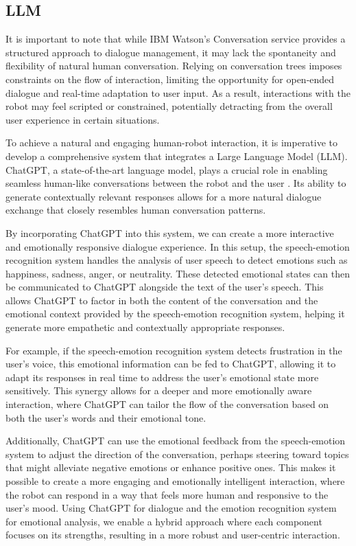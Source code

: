 \subsection{LLM}

It is important to note that while IBM Watson's Conversation service provides a structured approach to dialogue management, it may lack the spontaneity and flexibility of natural human conversation. Relying on conversation trees imposes constraints on the flow of interaction, limiting the opportunity for open-ended dialogue and real-time adaptation to user input. As a result, interactions with the robot may feel scripted or constrained, potentially detracting from the overall user experience in certain situations.

To achieve a natural and engaging human-robot interaction, it is imperative to develop a comprehensive system that integrates a Large Language Model (LLM). ChatGPT, a state-of-the-art language model, plays a crucial role in enabling seamless human-like conversations between the robot and the user \cite{chatgpt}. Its ability to generate contextually relevant responses allows for a more natural dialogue exchange that closely resembles human conversation patterns.

By incorporating ChatGPT into this system, we can create a more interactive and emotionally responsive dialogue experience. In this setup, the speech-emotion recognition system handles the analysis of user speech to detect emotions such as happiness, sadness, anger, or neutrality. These detected emotional states can then be communicated to ChatGPT alongside the text of the user's speech. This allows ChatGPT to factor in both the content of the conversation and the emotional context provided by the speech-emotion recognition system, helping it generate more empathetic and contextually appropriate responses.

For example, if the speech-emotion recognition system detects frustration in the user's voice, this emotional information can be fed to ChatGPT, allowing it to adapt its responses in real time to address the user's emotional state more sensitively. This synergy allows for a deeper and more emotionally aware interaction, where ChatGPT can tailor the flow of the conversation based on both the user's words and their emotional tone.

Additionally, ChatGPT can use the emotional feedback from the speech-emotion system to adjust the direction of the conversation, perhaps steering toward topics that might alleviate negative emotions or enhance positive ones. This makes it possible to create a more engaging and emotionally intelligent interaction, where the robot can respond in a way that feels more human and responsive to the user's mood. Using ChatGPT for dialogue and the emotion recognition system for emotional analysis, we enable a hybrid approach where each component focuses on its strengths, resulting in a more robust and user-centric interaction.

